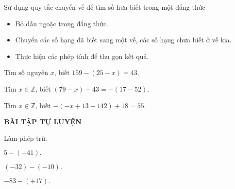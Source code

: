 \begin{dang}{Sử dụng quy tắc chuyển vế để tìm số hưa biết trong một đẳng thức}
	\begin{itemize}
		\item Bỏ dấu ngoặc trong đẳng thức.
		\item Chuyển các số hạng đã biết sang một vế, các số hạng chưa biết ở vế kia.
		\item Thực hiện các phép tính để thu gọn kết quả.
	\end{itemize}
	\end{dang}
\begin{vd}%
	Tìm số nguyên $x$, biết $159 -(25-x)= 43.$
\end{vd}
\begin{vd}%
	Tìm $x \in \mathbb{Z}$, biết $(79 -x)- 43 = -(17-52).$
	\loigiai{ \begin{center}
			 $\begin{aligned}[[t]
		79 -x)- 43 &= -(17-52)\\
		79-x -43&= -17 +52\\
		-x&= -17+52-79+43\\
		-x&=-1\\
		x&=1.
		\end{aligned}$
		\end{center}
}
\end{vd}
\begin{vd}%
	Tìm $x \in \mathbb{Z}$, biết $-(-x+13-142)+18=55.$
	\loigiai{
   \begin{center}
   	$\begin{aligned}[[t]
	-(-x+13-142)+18&=55\\
	x-13+142+18&=55\\
		x&= 55+13-142-18\\
		x&=-92.
		\end{aligned}$
   \end{center}
}
\end{vd}
\begin{center}
	\textbf{BÀI TẬP TỰ LUYỆN}
\end{center}
\begin{bt}%
	Làm phép trừ.
	\begin{enumEX}{3}
		\item $5-(-41).$
		\item $(-32) -(-10).$
		\item $-83-(+17).$
	\end{enumEX}
\end{bt}%
